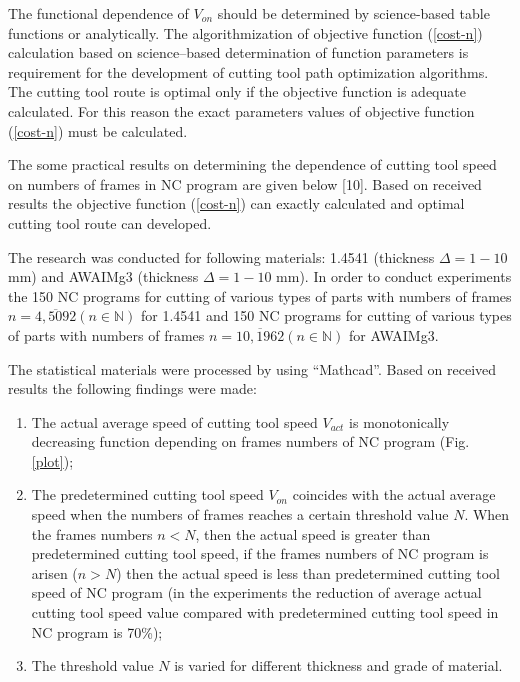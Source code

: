 \documentclass[runningheads]{llncs}
\begin{document}
The functional dependence of $V_{on}$
should be determined by science-based table functions or analytically.
The algorithmization of objective function (\ref{cost-n})
calculation based on science–based determination of function parameters
is requirement for the development of cutting tool path optimization algorithms.
The cutting tool route is optimal only if
the objective function is adequate calculated.
For this reason the exact parameters values of objective function (\ref{cost-n})
must be calculated.

The some practical results on determining
the dependence of cutting tool speed on numbers of frames in NC program
are given below [10].
Based on received results the objective function (\ref{cost-n})
can exactly calculated and optimal cutting tool route can developed.

The research was conducted for following materials:
1.4541 (thickness $\Delta=1-10$ mm) and
AWAIMg3 (thickness $\Delta=1-10$ mm).
In order to conduct experiments the 150 NC programs
for cutting of various types of parts with numbers of frames
$n=\overline{4, 5092}(n \in \mathbb{N})$
for 1.4541
and 150 NC programs for cutting of various types of parts with numbers of frames
$n = \overline{10, 1962} (n \in \mathbb N)$
for AWAIMg3.

The statistical materials were processed by using ``Mathcad''.
Based on received results the following findings were made:

\begin{enumerate}
\item
The actual average speed of cutting tool speed $V_{act}$
is monotonically decreasing function depending on frames numbers of NC program
(Fig. \ref{plot});

\item
The predetermined cutting tool speed $V_{on}$
coincides with the actual average speed
when the numbers of frames reaches a certain threshold value $N$.
When the frames numbers $n < N$,
then the actual speed is greater than predetermined cutting tool speed,
if the frames numbers of NC program is arisen ($n>N$)
then the actual speed is less than
predetermined cutting tool speed of NC program
(in the experiments the reduction of average actual cutting tool speed value
compared with predetermined cutting tool speed in NC program is 70\%);

\item
The threshold value $N$ is varied for different thickness and grade of material.
\end{enumerate}
\end{document}
